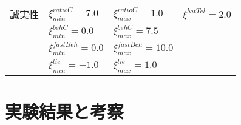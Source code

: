 \begin{table}[tb]
\begin{tabular}{llll}
        誠実性 & $\xi_{min}^{\mathit{ratioC}} = 7.0$ & $\xi_{max}^{\mathit{ratioC}} = 1.0$ & $\xi^{batTel} = 2.0$ \\
        & $\xi_{min}^{\mathit{behC}} = 0.0$ & $\xi_{max}^{\mathit{behC}} = 7.5$ \\
        & $\xi_{min}^{\mathit{fastBeh}} = 0.0$ & $\xi_{max}^{\mathit{fastBeh}} = 10.0$ \\
        & $\xi_{min}^{\mathit{lie}} = -1.0$ & $\xi_{max}^{\mathit{lie}} = 1.0$ \\ \bottomrule
    \end{tabular}
    \label{tab:xi-param}
\end{table}

\clearpage

\section{実験結果と考察}


